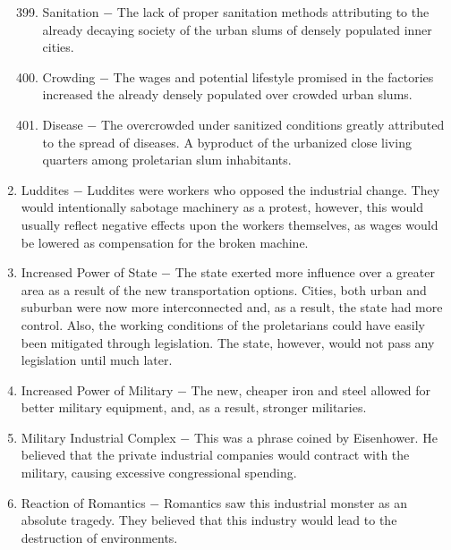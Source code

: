 \documentclass[12pt]{article}
\begin{document}
\begin{enumerate}
\begin{enumerate}[label=\arabic{*}.]
\setcounter{enumii}{398}

\item Sanitation $-$ The lack of proper sanitation methods attributing to the already decaying society of the urban slums of densely populated inner cities.

\item Crowding $-$ The wages and potential lifestyle promised in the factories increased the already densely populated over crowded urban slums.

\item Disease $-$ The overcrowded under sanitized conditions greatly attributed to the spread of diseases. A byproduct of the urbanized close living quarters among proletarian slum inhabitants. 

\end{enumerate}
\setcounter{enumi}{401}

\item Luddites $-$ Luddites were workers who opposed the industrial change. They would intentionally sabotage machinery as a protest, however, this would usually reflect negative effects upon the workers themselves, as wages would be lowered as compensation for the broken machine. 

\item Increased Power of State $-$ The state exerted more influence over a greater area as a result of the new transportation options. Cities, both urban and suburban were now more interconnected and, as a result, the state had more control. Also, the working conditions of the proletarians could have easily been mitigated through legislation. The state, however, would not pass any legislation until much later.

\item Increased Power of Military $-$ The new, cheaper iron and steel allowed for better military equipment, and, as a result, stronger militaries.  

\item Military Industrial Complex $-$ This was a phrase coined by Eisenhower. He believed that the private industrial companies would contract with the military, causing excessive congressional spending.

\item Reaction of Romantics $-$ Romantics saw this industrial monster as an absolute tragedy. They believed that this industry would lead to the destruction of environments.


\end{enumerate}
\end{document}

